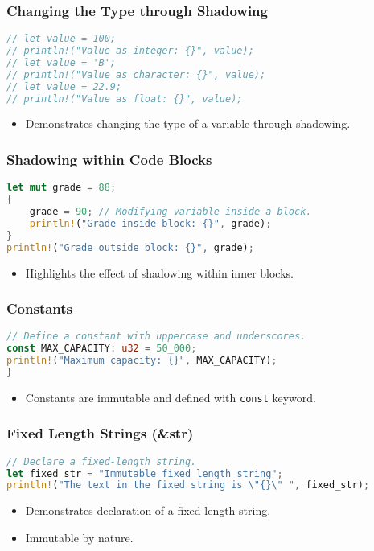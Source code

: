 \documentclass[aspectratio=169, table]{beamer}
\begin{document}
\begin{frame}[fragile]
\frametitle{Changing the Type through Shadowing}
\begin{lstlisting}[language=Rust]
// let value = 100;
// println!("Value as integer: {}", value);
// let value = 'B';
// println!("Value as character: {}", value);
// let value = 22.9;
// println!("Value as float: {}", value);
\end{lstlisting}
\begin{itemize}
\item Demonstrates changing the type of a variable through shadowing.
\end{itemize}
\end{frame}

\begin{frame}[fragile]
\frametitle{Shadowing within Code Blocks}
\begin{lstlisting}[language=Rust]
let mut grade = 88;
{
	grade = 90; // Modifying variable inside a block.
	println!("Grade inside block: {}", grade);
}
println!("Grade outside block: {}", grade);
\end{lstlisting}
\begin{itemize}
\item Highlights the effect of shadowing within inner blocks.
\end{itemize}
\end{frame}

\begin{frame}[fragile]
\frametitle{Constants}
\begin{lstlisting}[language=Rust]
// Define a constant with uppercase and underscores.
const MAX_CAPACITY: u32 = 50_000;
println!("Maximum capacity: {}", MAX_CAPACITY);
}
\end{lstlisting}
\begin{itemize}
\item Constants are immutable and defined with \texttt{const} keyword.
\end{itemize}
\end{frame}

\begin{frame}[fragile]
\frametitle{Fixed Length Strings (\&str)}
\begin{lstlisting}[language=Rust]
// Declare a fixed-length string.
let fixed_str = "Immutable fixed length string";
println!("The text in the fixed string is \"{}\" ", fixed_str);
\end{lstlisting}
\begin{itemize}
\item Demonstrates declaration of a fixed-length string.
\item Immutable by nature.
\end{itemize}
\end{frame}
\end{document}
